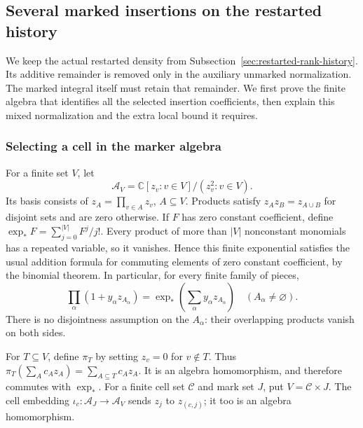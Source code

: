 \subsection{Several marked insertions on the restarted history}
\label{sec:allarity-planted-compiler}

We keep the actual restarted density from
Subsection~\ref{sec:restarted-rank-history}. Its additive remainder is
removed only in the auxiliary unmarked normalization. The marked integral
itself must retain that remainder. We first prove the finite algebra that
identifies all the selected insertion coefficients, then explain this
mixed normalization and the extra local bound it requires.

\subsubsection{Selecting a cell in the marker algebra}

For a finite set $V$, let
\[
 \mathscr A_V=\mathbb C[z_v:v\in V]/(z_v^2:v\in V).
\]
Its basis consists of $z_A=\prod_{v\in A}z_v$, $A\subseteq V$.
Products satisfy $z_Az_B=z_{A\cup B}$ for disjoint sets and are zero
otherwise. If $F$ has zero constant coefficient, define
$\exp_*F=\sum_{j=0}^{|V|}F^j/j!$. Every product of more than $|V|$
nonconstant monomials has a repeated variable, so it vanishes. Hence
this finite exponential satisfies the usual addition formula for
commuting elements of zero constant coefficient, by the binomial theorem.
In particular, for every finite family of pieces,
\begin{equation}\label{eq:planted-exp}
 \prod_\alpha(1+y_\alpha z_{A_\alpha})
       =\exp_*\left(\sum_\alpha y_\alpha z_{A_\alpha}\right)
       \quad(A_\alpha\ne\varnothing).
\end{equation}
There is no disjointness assumption on the $A_\alpha$: their overlapping
products vanish on both sides.

For $T\subseteq V$, define $\pi_T$ by setting $z_v=0$ for $v\notin T$.
Thus $\pi_T(\sum_A c_Az_A)=\sum_{A\subseteq T}c_Az_A$.
It is an algebra homomorphism, and therefore commutes with $\exp_*$.
For a finite cell set $\mathcal C$ and mark set $J$, put
$V=\mathcal C\times J$. The cell embedding
$\iota_c:\mathscr A_J\to\mathscr A_V$ sends $z_j$ to $z_{(c,j)}$;
it too is an algebra homomorphism.

